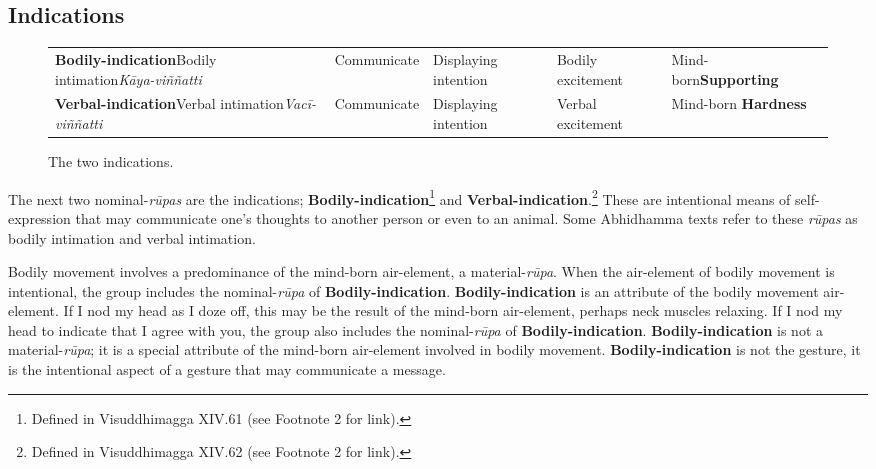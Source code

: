 \subsection*{Indications}

\begin{figure} [H]
\setlength{\tabcolsep}{0pt}
\renewcommand{\arraystretch}{1.1}
\noindent\begin{tabular}{P{0.25\textwidth} | C{.185\textwidth} C{0.185\textwidth} C{0.185\textwidth} C{0.195\textwidth} m{0mm}}
\toprule
 &  &  &  & \\
\midrule
\textbf{Bodily-indication}\newline Bodily intimation\newline \textit{Kāya-viññatti} & Communicate & Displaying intention & Bodily excitement & Mind-born\newline \textbf{Supporting} &\\[12mm]
\textbf{Verbal-indication}\newline Verbal intimation\newline \textit{Vacī-viññatti} & Communicate & Displaying intention & Verbal excitement & Mind-born \textbf{Hardness} &\\[12mm]
\bottomrule
\end{tabular}
\caption[]{The two indications.\footnotemark}
\end{figure}


The next two nominal-\textit{rūpas} are the indications; \textbf{Bodily-indication}\footnote{Defined in Visuddhimagga XIV.61 (see Footnote 2 for link).} and \textbf{Verbal-indication}.\footnote{Defined in Visuddhimagga XIV.62 (see Footnote 2 for link).} These are intentional means of self-expression that may communicate one’s thoughts to another person or even to an animal. Some Abhidhamma texts refer to these \textit{rūpas} as bodily intimation and verbal intimation.

Bodily movement involves a predominance of the mind-born air-element, a material-\textit{rūpa}. When the air-element of bodily movement is intentional, the group includes the nominal-\textit{rūpa} of \textbf{Bodily-indication}. \textbf{Bodily-indication} is an attribute of the bodily movement air-element. If I nod my head as I doze off, this may be the result of the mind-born air-element, perhaps neck muscles relaxing. If I nod my head to indicate that I agree with you, the group also includes the nominal-\textit{rūpa} of \textbf{Bodily-indication}. \textbf{Bodily-indication} is not a material-\textit{rūpa}; it is a special attribute of the mind-born air-element involved in bodily movement. \textbf{Bodily-indication} is not the gesture, it is the intentional aspect of a gesture that may communicate a message.

